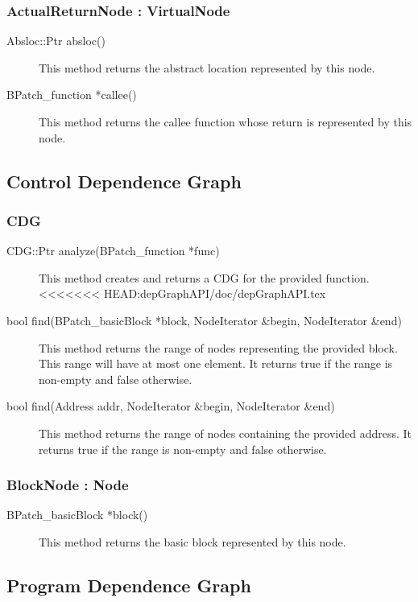 \documentclass[12pt,titlepage]{article}
\begin{document}
\subsubsection{ActualReturnNode : VirtualNode}
\begin{description}
\item[Absloc::Ptr absloc()]
This method returns the abstract location represented by this node.
\item[BPatch\_function *callee() ]
This method returns the callee function whose return is represented by this node.
\end{description}

\subsection{Control Dependence Graph}
\subsubsection{CDG}
\begin{description}
\item[CDG::Ptr analyze(BPatch\_function *func)]
This method creates and returns a CDG for the provided function.
<<<<<<< HEAD:depGraphAPI/doc/depGraphAPI.tex
\item[bool find(BPatch\_basicBlock *block, NodeIterator \&begin, NodeIterator \&end)]
This method returns the range of nodes representing the provided
block. This range will have at most one element. It returns true if
the range is non-empty and false otherwise. 
\item[bool find(Address addr, NodeIterator \&begin, NodeIterator
\&end)] This method returns the range of nodes containing the provided
address. It returns true if the range is non-empty and false
otherwise.
\end{description}

\subsubsection{BlockNode : Node}
\begin{description}
\item[BPatch\_basicBlock *block() ]
This method returns the basic block represented by this node. 
\end{description}

\subsection{Program Dependence Graph}
\end{document}
